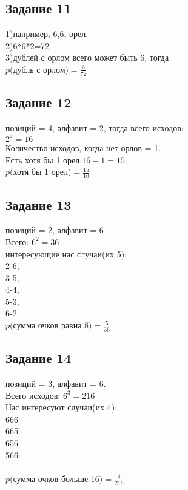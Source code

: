 \documentclass[12pt]{article}
\begin{document}
\subsection{Задание 11}

1)например, 6,6, орел.\\
2)6*6*2=72\\
3)дублей с орлом всего может быть 6, тогда\\
$p($дубль с орлом$) = \frac{6}{72}$

\newpage
\subsection{Задание 12}

позиций = 4, алфавит = 2, тогда всего исходов:\\
$2^4=16$\\
Количество исходов, когда нет орлов = 1.\\
Есть хотя бы 1 орел:$16 - 1 = 15$\\
$p($хотя бы 1 орел$) = \frac{15}{16}$

\newpage
\subsection{Задание 13}

позиций = 2, алфавит = 6\\
Всего: $6^2=36$\\
интересующие нас случаи(их 5):\\
 2-6,\\
 3-5,\\ 
4-4,\\
 5-3,\\
 6-2\\
$p($сумма очков равна 8$)=\frac{5}{36}$

\newpage
\subsection{Задание 14}

позиций = 3, алфавит = 6.\\
Всего исходов: $6^3=216$\\
Нас интересуют случаи(их 4):\\
666\\
665\\
656\\
566\\
\\
$p($сумма очков больше 16$)=\frac{4}{216}$
\end{document}
